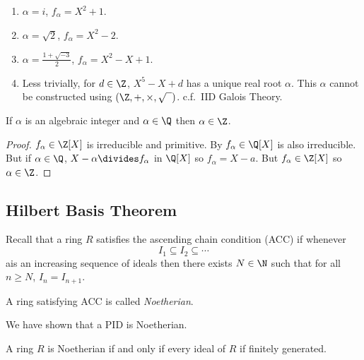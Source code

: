 \documentclass[a4paper]{article}
\theoremstyle{definition}
\begin{document}
\begin{eg}\leavevmode
  \begin{enumerate}
  \item \(\alpha = i\), \(f_\alpha = X^2 + 1\).
  \item \(\alpha = \sqrt 2\), \(f_\alpha = X^2 - 2\).
  \item \(\alpha = \frac{1 + \sqrt{-3}}{2}\), \(f_\alpha = X^2 - X + 1\).
  \item Less trivially, for \(d \in \Z\), \(X^5 - X + d\) has a unique real root \(\alpha\). This \(\alpha\) cannot be constructed using \((\Z, +, \times, \sqrt{\phantom{x}})\). c.f.\ IID Galois Theory.
  \end{enumerate}
\end{eg}

\begin{lemma}
  If \(\alpha\) is an algebraic integer and \(\alpha \in \Q\) then \(\alpha \in \Z\).
\end{lemma}

\begin{proof}
  \(f_\alpha \in \Z[X]\) is irreducible and primitive. By  \(f_\alpha \in \Q[X]\) is also irreducible. But if \(\alpha \in \Q\), \(X - \alpha \divides f_\alpha\) in \(\Q[X]\) so \(f_\alpha = X - a\). But \(f_\alpha \in \Z[X]\) so \(\alpha \in \Z\).
\end{proof}

\subsection{Hilbert Basis Theorem}

Recall that a ring \(R\) satisfies the ascending chain condition (ACC) if whenever
\[
  I_1 \subseteq I_2 \subseteq \cdots
\]
ais an increasing sequence of ideals then there exists \(N \in \N\) such that for all \(n \geq N\), \(I_n = I_{n + 1}\).

A ring satisfying ACC is called \emph{Noetherian}.

We have shown that a PID is Noetherian.

\begin{lemma}
  A ring \(R\) is Noetherian if and only if every ideal of \(R\) if finitely generated.
\end{lemma}
\end{document}
